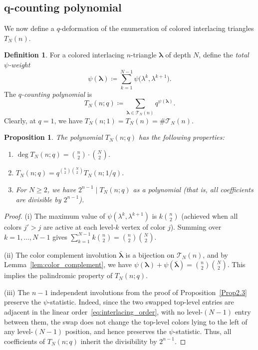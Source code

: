 \documentclass[10pt,a4paper]{amsart}
\numberwithin{equation}{section}
\newtheorem{Proposition}[Theorem]{Proposition}
\theoremstyle{definition}
\newtheorem{Definition}[Theorem]{Definition}
\begin{document}
\subsection[q-counting polynomial]{$\boldsymbol{q}$-counting polynomial}
\label{subsec:q_counting_polynomial}

We now define a $q$-deformation of the enumeration of colored interlacing
triangles $T_N(n)$.

\begin{Definition}
	\label{def:q_polynomial} For a colored interlacing $n$-triangle
	$\boldsymbol\lambda$ of depth $N$, define the \emph{total $\psi$-weight}
	\begin{equation*}
		\psi(\boldsymbol\lambda) \coloneqq \sum_{k=1}^{N-1} \psi\bigl(\lambda^k,
		\lambda^{k+1}\bigr).
	\end{equation*}
	The \emph{$q$-counting polynomial} is
	\begin{equation*}
		T_N(n;q) \coloneqq \sum_{\boldsymbol\lambda \in \mathcal{T}_N(n)}
		q^{\psi(\boldsymbol\lambda)}.
	\end{equation*}
	Clearly, at $q=1$, we have $T_N(n;1) = T_N(n) = \#\mathcal{T}_N(n)$.
\end{Definition}

\begin{Proposition}
	\label{prop:q_polynomial_properties} The polynomial $T_N(n;q)$ has the
	following properties:
	\begin{enumerate}[\rm (i)]\itemsep=0pt
		\item $\deg T_N(n;q) = \binom{n}{2} \cdot \binom{N}{2}$.
		\item $T_N(n;q) = q^{\binom{n}{2}\binom{N}{2}} T_N(n;1/q)$.
		\item For $N\ge2$, we have $2^{n-1} \mid T_N(n;q)$ as a polynomial
		(that is, all coefficients are divisible by $2^{n-1}$).
	\end{enumerate}
\end{Proposition}
\begin{proof}
(i) The maximum value of $\psi(\lambda^k, \lambda^{k+1})$ is $k\binom{n}{2}$
		(achieved when all colors $j' > j$ are active at each level-$k$ vertex
		of color $j$).
		Summing over $k=1,\dots,N-1$ gives
		$\sum_{k=1}^{N-1} k\binom{n}{2} = \binom{n}{2}\binom{N}{2}$.

(ii) The color complement involution $\bar{\boldsymbol\lambda}$
		is a bijection on $\mathcal{T}_N(n)$, and by
		Lemma~\ref{lem:color_complement}, we have
		$\psi(\boldsymbol\lambda) + \psi(\bar{\boldsymbol\lambda}) = \binom{n}{2}\binom{N}{2}$.
		This implies the palindromic property of $T_N(n;q)$.

(iii)
The $n-1$
independent involutions from the proof of Proposition~\ref{Prop2.3} preserve
the $\psi$-statistic. Indeed, since the two swapped top-level
entries are adjacent in the linear order~\eqref{eq:interlacing_order}, with no
level-$(N-1)$ entry between them, the swap does not change the
top-level colors lying to the left of any level-$(N-1)$ position,
and hence preserves the $\psi$-statistic.
Thus, all coefficients of $T_N(n;q)$ inherit the divisibility by
		$2^{n-1}$.
\end{proof}
\end{document}
